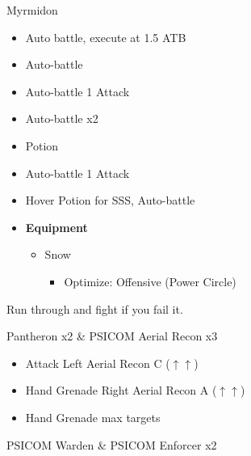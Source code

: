 	\begin{battle}[0:43]{Myrmidon}
		\begin{itemize}
			\item Auto battle, execute at 1.5 ATB
			\item Auto-battle
			\item Auto-battle 1 Attack
			\item Auto-battle x2
			\item Potion
			\item Auto-battle 1 Attack
			\item Hover Potion for SSS, Auto-battle
		\end{itemize}

	\end{battle}


	\begin{menu}
		\begin{itemize}
			\item \textbf{Equipment}
			      \begin{itemize}
				      \item Snow
				            \begin{itemize}
					            \item Optimize: Offensive (Power Circle)
				            \end{itemize}
			      \end{itemize}
		\end{itemize}
	\end{menu}

	Run through and fight if you fail it.

	\begin{battle}[0:30]{Pantheron x2 \& PSICOM Aerial Recon x3}
		\begin{itemize}
			\item Attack Left Aerial Recon C ($\uparrow\uparrow$)
			\item Hand Grenade Right Aerial Recon A ($\uparrow\uparrow$)
			\item Hand Grenade max targets
		\end{itemize}

	\end{battle}

	\begin{battle}[0:15]{PSICOM Warden \& PSICOM Enforcer x2}
	\end{battle}

